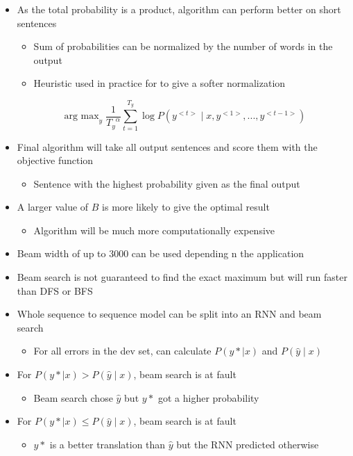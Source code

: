 \documentclass[12pt, letterpaper]{article}
\begin{document}
\begin{itemize}
        \item As the total probability is a product, algorithm can perform better on short sentences
        \begin{itemize}
            \item Sum of probabilities can be normalized by the number of words in the output
            \item Heuristic used in practice for to give a softer normalization
        \end{itemize}
        $$\mathop{\text{arg max}}_{y}\frac{1}{{T_y}^\alpha}\sum_{t=1}^{T_y}\log P(y^{<t>}\mid x,y^{<1>},...,y^{<t-1>})$$
        \item Final algorithm will take all output sentences and score them with the objective function
        \begin{itemize}
            \item Sentence with the highest probability given as the final output
        \end{itemize}
        \item A larger value of $B$ is more likely to give the optimal result
        \begin{itemize}
            \item Algorithm will be much more computationally expensive
        \end{itemize}
        \item Beam width of up to 3000 can be used depending n the application
        \item Beam search is not guaranteed to find the exact maximum but will run faster than DFS or BFS
        \item Whole sequence to sequence model can be split into an RNN and beam search
        \begin{itemize}
            \item For all errors in the dev set, can calculate $P(y*\mid x)$ and $P(\hat{y}\mid x)$
        \end{itemize}
        \item For $P(y*\mid x)>P(\hat{y}\mid x)$, beam search is at fault
        \begin{itemize}
            \item Beam search chose $\hat{y}$ but $y*$ got a higher probability
        \end{itemize}
        \item For $P(y*\mid x)\leq P(\hat{y}\mid x)$, beam search is at fault
        \begin{itemize}
            \item $y*$ is a better translation than $\hat{y}$ but the RNN predicted otherwise
        \end{itemize}
    \end{itemize}
\end{document}
